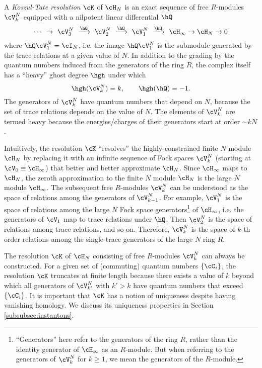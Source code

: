 \documentclass[a4paper,12pt]{article}
\begin{document}
A \textit{Koszul-Tate resolution} $\cK$ of $\cH_N$ is an exact sequence of free $R$-modules $\cV_k^{N}$ equipped with a nilpotent linear differential $\hQ$ 
\begin{equation}
\cdots \ \rightarrow \ \cV_3^{N} \ \xrightarrow{\hQ} \ \cV_2^{N} \ \xrightarrow{\hQ} \ \cV_1^{N} \ \xrightarrow{\hQ} \ \cH_\infty \rightarrow \cH_N \rightarrow 0
\end{equation}
where $\hQ \cV_1^{N} = \cI_N$, i.e. the image $\hQ \cV_1^{N}$ is the submodule generated by the trace relations at a given value of $N$. In addition to the grading by the quantum numbers induced from the generators of the ring $R$, the complex itself has a ``heavy'' ghost degree $\hgh$ under which
\begin{equation}
\hgh(\cV_k^N) = k, \qquad \hgh(\hQ) = -1.
\end{equation}
The generators of $\cV_k^{N}$ have quantum numbers that depend on $N$, because the set of trace relations depends on the value of $N$. The elements of $\cV_k^{N}$ are termed heavy because the energies/charges of their generators start at order $\sim k N$.

Intuitively, the resolution $\cK$ ``resolves'' the highly-constrained finite $N$ module $\cH_N$ by replacing it with an infinite sequence of Fock spaces $\cV_k^N$ (starting at $\cV_0 \equiv \cH_\infty$) that better and better approximate $\cH_N$. Since $\cH_\infty$ maps to $\cH_N$, the zeroth approximation to the finite $N$ module $\cH_N$ is the large $N$ module $\cH_\infty$. The subsequent free $R$-modules $\cV_k^N$ can be understood as the space of relations among the generators of $\cV_{k-1}^N$. For example, $\cV_1^N$ is the space of relations among the large $N$ Fock space generators\footnote{``Generators'' here refer to the generators of the ring $R$, rather than the identity generator of $\cH_\infty$ as an $R$-module. But when referring to the generators of $\cV_k^N$ for $k \geq 1$, we mean the generators of the $R$-module.} of $\cH_\infty$, i.e. the generators of $\cV_1$ map to trace relations under $\hQ$. Then $\cV_2^N$ is the space of relations among trace relations, and so on. Therefore, $\cV_k^N$ is the space of $k$-th order relations among the single-trace generators of the large $N$ ring $R$.

The resolution $\cK$ of $\cH_N$ consisting of free $R$-modules $\cV_k^N$ can always be constructed. For a given set of (commuting) quantum numbers $\{\cC_i\}$, the resolution $\cK$ truncates at finite length because there exists a value of $k$ beyond which all generators of $\cV_{k'}^N$ with $k'>k$ have quantum numbers that exceed $\{\cC_i\}$. It is important that $\cK$ has a notion of uniqueness despite having vanishing homology. We discuss its uniqueness properties in Section \ref{subsubsec:instantons}.
\end{document}
